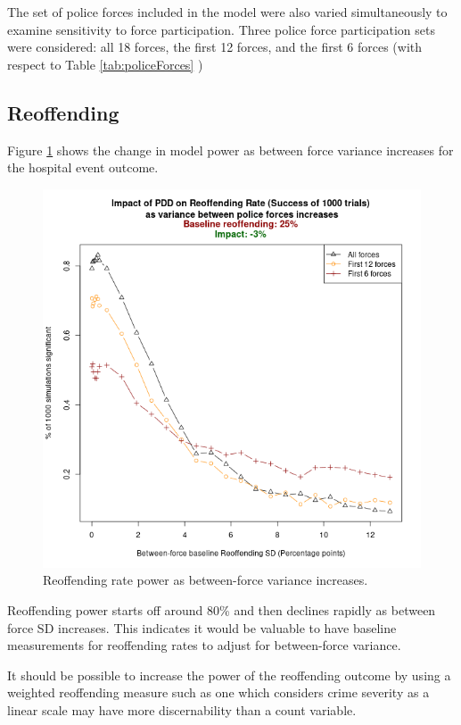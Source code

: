 \documentclass[
]{article}
\begin{document}
The set of police forces included in the model were also varied simultaneously to examine sensitivity to force participation. Three police force participation sets were considered: all 18 forces, the first 12 forces, and the first 6 forces (with respect to Table \ref{tab:policeForces} )

\hypertarget{reoffending}{%
\subsection{Reoffending}\label{reoffending}}

Figure \ref{fig:reoffendPower} shows the change in model power as between force variance increases for the hospital event outcome.

\begin{figure}

{\centering \includegraphics[width=0.8\linewidth]{figures/reoffending_vs_pf_original} 

}

\caption{Reoffending rate power as between-force variance increases.}\label{fig:reoffendPower}
\end{figure}

Reoffending power starts off around 80\% and then declines rapidly as between force SD increases. This indicates it would be valuable to have baseline measurements for reoffending rates to adjust for between-force variance.

It should be possible to increase the power of the reoffending outcome by using a weighted reoffending measure such as one which considers crime severity as a linear scale may have more discernability than a count variable.
\end{document}
